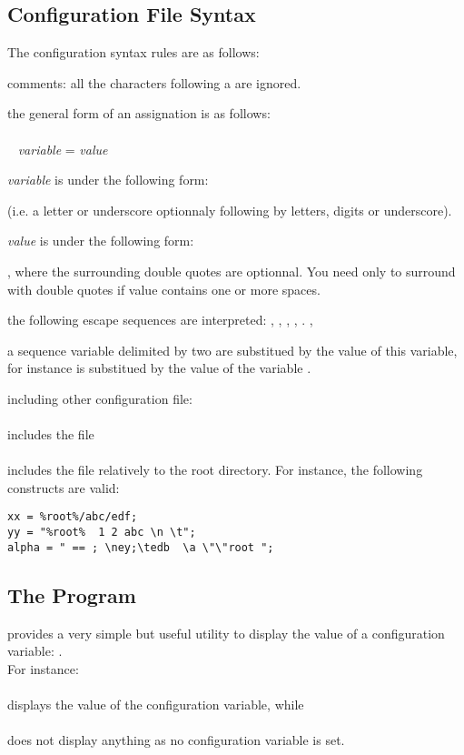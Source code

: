 \subsection{Configuration File Syntax}
The configuration syntax rules are as follows:
\bi
\item comments: all the characters following a \ttv{\#} are ignored.
\item the general form of an assignation is as follows:
\\
\\
\mbox{ } \emph{variable} = \emph{value}\ttv{;}
\item \emph{variable} is under the following form:
\bi
\item \ttv{[a-zA-Z\_][a-zA-Z\_0-9]*} (i.e. a letter or underscore optionnaly
following by letters, digits or underscore).
\ei
\item \emph{value} is under the following form:
\bi
\item {}, where the surrounding double
quotes are optionnal. You need only to surround with double quotes if
value contains one or more spaces.
\item the following escape sequences are interpreted:
, , , , .
, \esc{\textbackslash}
\item a sequence variable delimited by two \ttv{\%} are substitued by the value
of this variable, for instance  is substitued by the value of the
variable .
\ei
\item including other configuration file:
\\
\\
includes the file 
\\
\\
includes the file  relatively to the root \eyedb
directory.
\ei
For instance, the following constructs are valid:
\begin{verbatim}
xx = %root%/abc/edf;
yy = "%root%  1 2 abc \n \t";
alpha = " == ; \ney;\tedb  \a \"\"root ";
\end{verbatim}
\subsection{The  Program}
\eyedb provides a very simple but useful utility to display the
value of a configuration variable: .
\\
For instance:\\
\mbox{ }\\
displays the value of the  configuration variable, while\\
\mbox{ }\\
does not display anything as no configuration variable  is
set.
